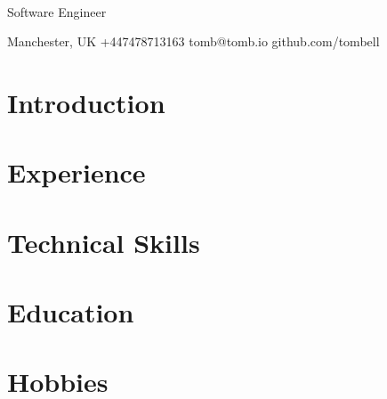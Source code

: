 \documentclass[11pt,a4paper]{article}
\renewcommand{\maketitle}{
  \begin{center}
    {\huge\bfseries\theauthor} \\
    \normalsize Software Engineer
  \end{center}
}
\begin{document}
  \author{Tom Bell}
  \maketitle

  \begin{center}
    \small
    \raisebox{-0.1\height}{\small\faMapMarker} Manchester, UK
    \hspace{1cm}
    \raisebox{-0.1\height}{\small\faMobile} +447478713163
    \hspace{1cm}
    \raisebox{-0.1\height}{\small\faAt} tomb@tomb.io
    \hspace{1cm}
    \raisebox{-0.1\height}{\small\faGithubAlt} github.com/tombell
  \end{center}

  \section{Introduction}
  \section{Experience}
  \section{Technical Skills}
  \section{Education}
  \section{Hobbies}
\end{document}

